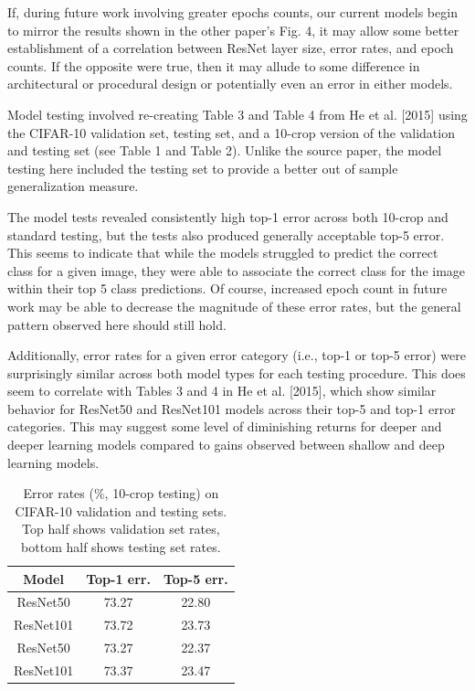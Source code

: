 \documentclass[sigplan]{acmart}
\begin{document}
If, during future work involving greater epochs counts, our current models begin to mirror the results shown in the other paper's Fig. 4, it may allow some better establishment of a correlation between ResNet layer size, error rates, and epoch counts. If the opposite were true, then it may allude to some difference in architectural or procedural design or potentially even an error in either models.

Model testing involved re-creating Table 3 and Table 4 from He et al. [2015] using the CIFAR-10 validation set, testing set, and a 10-crop version of the validation and testing set (see Table 1 and Table 2). Unlike the source paper, the model testing here included the testing set to provide a better out of sample generalization measure.

The model tests revealed consistently high top-1 error across both 10-crop and standard testing, but the tests also produced generally acceptable top-5 error. This seems to indicate that while the models struggled to predict the correct class for a given image, they were able to associate the correct class for the image within their top 5 class predictions. Of course, increased epoch count in future work may be able to decrease the magnitude of these error rates, but the general pattern observed here should still hold.

Additionally, error rates for a given error category (i.e., top-1 or top-5 error) were surprisingly similar across both model types for each testing procedure. This does seem to correlate with Tables 3 and 4 in He et al. [2015], which show similar behavior for ResNet50 and ResNet101 models across their top-5 and top-1 error categories. This may suggest some level of diminishing returns for deeper and deeper learning models compared to gains observed between shallow and deep learning models.

\begin{table}
  \caption{Error rates (\%, 10-crop testing) on CIFAR-10 validation and testing sets. Top half shows validation set rates, bottom half shows testing set rates.}
  \label{tab:err10}
  \begin{tabular}{ccc}
    \toprule
    Model & Top-1 err. & Top-5 err. \\
    \midrule
    ResNet50 & 73.27 & 22.80 \\
    ResNet101 & 73.72 & 23.73 \\
    \midrule
    ResNet50 & 73.27 & 22.37 \\
    ResNet101 & 73.37 & 23.47 \\
    \bottomrule
  \end{tabular}
\end{table}
\end{document}
